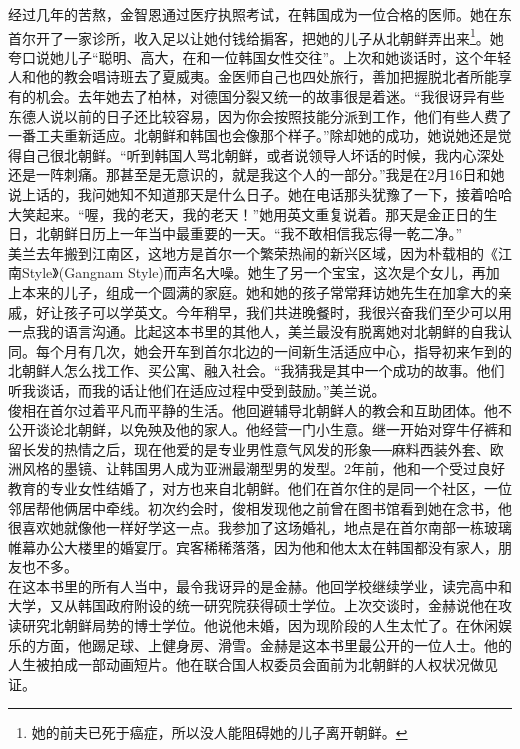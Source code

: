 经过几年的苦熬，金智恩通过医疗执照考试，在韩国成为一位合格的医师。她在东首尔开了一家诊所，收入足以让她付钱给掮客，把她的儿子从北朝鲜弄出来\footnote{她的前夫已死于癌症，所以没人能阻碍她的儿子离开朝鲜。}。她夸口说她儿子“聪明、高大，在和一位韩国女性交往”。上次和她谈话时，这个年轻人和他的教会唱诗班去了夏威夷。金医师自己也四处旅行，善加把握脱北者所能享有的机会。去年她去了柏林，对德国分裂又统一的故事很是着迷。“我很讶异有些东德人说以前的日子还比较容易，因为你会按照技能分派到工作，他们有些人费了一番工夫重新适应。北朝鲜和韩国也会像那个样子。”除却她的成功，她说她还是觉得自己很北朝鲜。“听到韩国人骂北朝鲜，或者说领导人坏话的时候，我内心深处还是一阵刺痛。那甚至是无意识的，就是我这个人的一部分。”我是在2月16日和她说上话的，我问她知不知道那天是什么日子。她在电话那头犹豫了一下，接着哈哈大笑起来。“喔，我的老天，我的老天！”她用英文重复说着。那天是金正日的生日，北朝鲜日历上一年当中最重要的一天。“我不敢相信我忘得一乾二净。”\\

美兰去年搬到江南区，这地方是首尔一个繁荣热闹的新兴区域，因为朴载相的《江南Style》(Gangnam Style)而声名大噪。她生了另一个宝宝，这次是个女儿，再加上本来的儿子，组成一个圆满的家庭。她和她的孩子常常拜访她先生在加拿大的亲戚，好让孩子可以学英文。今年稍早，我们共进晚餐时，我很兴奋我们至少可以用一点我的语言沟通。比起这本书里的其他人，美兰最没有脱离她对北朝鲜的自我认同。每个月有几次，她会开车到首尔北边的一间新生活适应中心，指导初来乍到的北朝鲜人怎么找工作、买公寓、融入社会。“我猜我是其中一个成功的故事。他们听我谈话，而我的话让他们在适应过程中受到鼓励。”美兰说。\\

俊相在首尔过着平凡而平静的生活。他回避辅导北朝鲜人的教会和互助团体。他不公开谈论北朝鲜，以免殃及他的家人。他经营一门小生意。继一开始对穿牛仔裤和留长发的热情之后，现在他爱的是专业男性意气风发的形象──麻料西装外套、欧洲风格的墨镜、让韩国男人成为亚洲最潮型男的发型。2年前，他和一个受过良好教育的专业女性结婚了，对方也来自北朝鲜。他们在首尔住的是同一个社区，一位邻居帮他俩居中牵线。初次约会时，俊相发现他之前曾在图书馆看到她在念书，他很喜欢她就像他一样好学这一点。我参加了这场婚礼，地点是在首尔南部一栋玻璃帷幕办公大楼里的婚宴厅。宾客稀稀落落，因为他和他太太在韩国都没有家人，朋友也不多。\\

在这本书里的所有人当中，最令我讶异的是金赫。他回学校继续学业，读完高中和大学，又从韩国政府附设的统一研究院获得硕士学位。上次交谈时，金赫说他在攻读研究北朝鲜局势的博士学位。他说他未婚，因为现阶段的人生太忙了。在休闲娱乐的方面，他踢足球、上健身房、滑雪。金赫是这本书里最公开的一位人士。他的人生被拍成一部动画短片。他在联合国人权委员会面前为北朝鲜的人权状况做见证。\\

